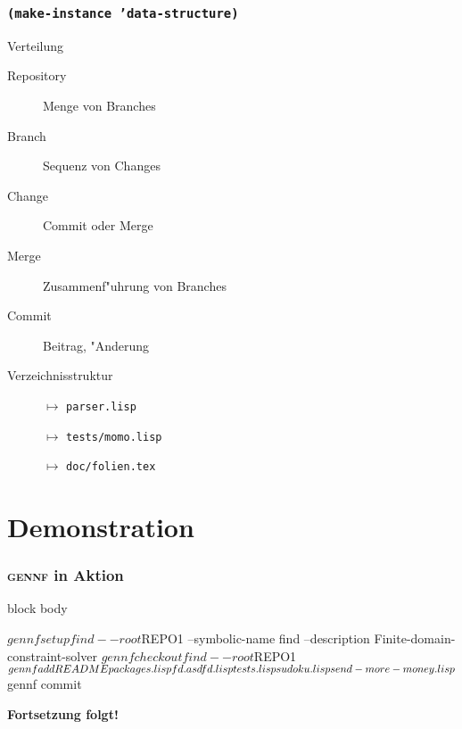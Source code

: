 \documentclass[german, presentation]{beamer}
\newcommand{\GENNF}{\textsc{gennf}}
\begin{document}
\begin{frame}
 \frametitle{\tt (make-instance 'data-structure)}
 \begin{block}{Verteilung} 
   \begin{description}
   \item[\sf Repository] Menge von Branches
   \item[\sf Branch] Sequenz von Changes
   \item[\sf Change] Commit oder Merge
   \item[\sf Merge] Zusammenf"uhrung von Branches
   \item[\sf Commit] Beitrag, "Anderung
   \end{description}
 \end{block}
 \begin{block}{Verzeichnisstruktur} 
   \begin{description}
   \item[] $\mapsto$ \tt parser.lisp
   \item[] $\mapsto$ \tt tests/momo.lisp
   \item[] $\mapsto$ \tt doc/folien.tex
   \end{description}
 \end{block}
\end{frame}



\section{Demonstration}


\begin{frame}[fragile]
  \frametitle{\GENNF{} in Aktion}
  \begin{beamercolorbox}{block body}
    {\small
\begin{semiverbatim}
 $ gennf setup find --root $REPO1 --symbolic-name find
     --description Finite-domain-constraint-solver \vspace{5pt}
 $ gennf checkout find --root $REPO1 \vspace{5pt}
 $ gennf add README packages.lisp fd.asd fd.lisp
     tests.lisp sudoku.lisp send-more-money.lisp \vspace{5pt}
 $ gennf commit
\end{semiverbatim}
    }
  \end{beamercolorbox}
  
  \bigskip

  \begin{center}
    {\Large\bf \alert{Fortsetzung folgt!}}
  \end{center}

\end{frame}
\end{document}
